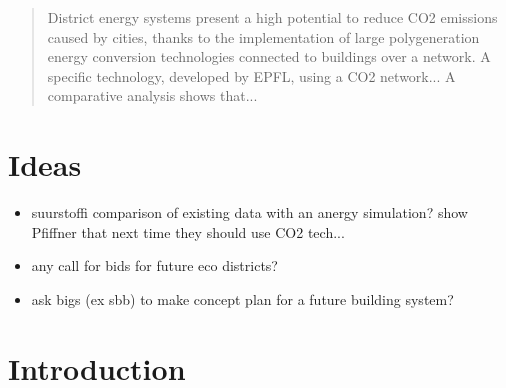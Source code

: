 \documentclass{article}
\begin{document}


\newpage
\null
\thispagestyle{empty} %
\clearpage

\listoftodos
\newpage

\begin{abstract}
District energy systems present a high potential to reduce CO2 emissions caused by cities, thanks to the implementation of large polygeneration energy conversion technologies connected to buildings over a network.
A specific technology, developed by EPFL, using a CO2 network...
A comparative analysis shows that...
\end{abstract}

\newpage
\tableofcontents
\thispagestyle{empty} 




\setcounter{page}{1}
\renewcommand{\thepage}{\arabic{page}}
\newpage

\section*{Ideas}
\begin{itemize}
\item suurstoffi comparison of existing data with an anergy simulation? show Pfiffner that next time they should use CO2 tech...
\item any call for bids for future eco districts?
\item ask bigs (ex sbb) to make concept plan for a future building system?
\end{itemize}

\section{Introduction}

\end{document}
